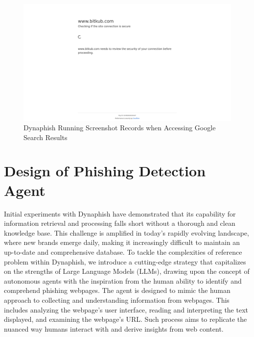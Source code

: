 \begin{figure}[H]
\caption{Dynaphish Running Screenshot Records when Accessing Google Search Results}
\centering
\includegraphics[width=1\textwidth]{images/biktub.png}
\end{figure}

\section{Design of Phishing Detection Agent}

Initial experiments with Dynaphish have demonstrated that its capability for information retrieval and processing falls short without a thorough and clean knowledge base. This challenge is amplified in today's rapidly evolving landscape, where new brands emerge daily, making it increasingly difficult to maintain an up-to-date and comprehensive database. To tackle the complexities of reference problem within Dynaphish, we introduce a cutting-edge strategy that capitalizes on the strengths of Large Language Models (LLMs), drawing upon the concept of autonomous agents with the inspiration from the human ability to identify and comprehend phishing webpages. The agent is designed to mimic the human approach to collecting and understanding information from webpages. This includes analyzing the webpage's user interface, reading and interpreting the text displayed, and examining the webpage's URL. Such process aims to replicate the nuanced way humans interact with and derive insights from web content. 

